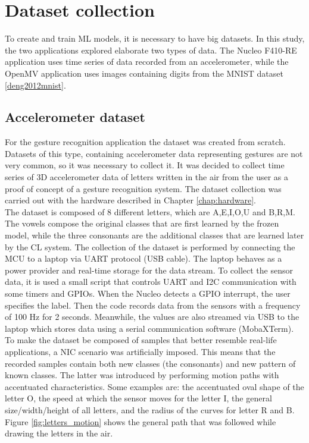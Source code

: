\documentclass[12pt]{report}
\begin{document}
\section{Dataset collection}
To create and train ML models, it is necessary to have big datasets. In this study, the two applications explored elaborate two types of data. The Nucleo F410-RE application uses time series of data recorded from an accelerometer, while the OpenMV application uses images containing digits from the MNIST dataset \ref{deng2012mnist}. \\

\subsection{Accelerometer dataset}
For the gesture recognition application the dataset was created from scratch. Datasets of this type, containing accelerometer data representing gestures are not very common, so it was necessary to collect it. It was decided to collect time series of 3D accelerometer data of letters written in the air from the user as a proof of concept of a gesture recognition system.
The dataset collection was carried out with the hardware described in Chapter \ref{chap:hardware}. \\
The dataset is composed of 8 different letters, which are A,E,I,O,U and B,R,M. The vowels compose the original classes that are first learned by the frozen model, while the three consonants are the additional classes that are learned later by the CL system. The collection of the dataset is performed by connecting the MCU to a laptop via UART protocol (USB cable). The laptop behaves as a power provider and real-time storage for the data stream. 
To collect the sensor data, it is used a small script that controls UART and I2C communication with some timers and GPIOs. When the Nucleo detects a GPIO interrupt, the user specifies the label. Then the code records data from the sensors with a frequency of 100 Hz for 2 seconds. Meanwhile, the values are also streamed via USB to the laptop which stores data using a serial communication software (MobaXTerm). \\
To make the dataset be composed of samples that better resemble real-life applications, a NIC scenario was artificially imposed. This means that the recorded samples contain both new classes (the consonants) and new pattern of known classes. The latter was introduced by performing motion paths with accentuated characteristics. Some examples are: the accentuated oval shape of the letter O, the speed at which the sensor moves for the letter I, the general size/width/height of all letters, and the radius of the curves for letter R and B.
Figure \ref{fig:letters_motion} shows the general path that was followed while drawing the letters in the air.\\
\end{document}
